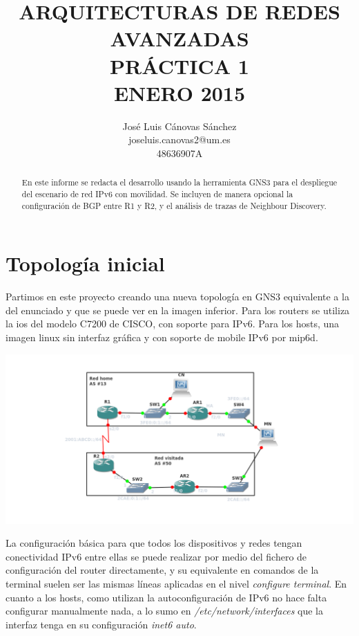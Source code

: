 \documentclass{article}
\author{José Luis Cánovas Sánchez\\joseluis.canovas2@um.es\\48636907A}
\title{ARQUITECTURAS DE REDES AVANZADAS\\PRÁCTICA 1\\ ENERO 2015}
\date{}
\begin{document}
\maketitle

\begin{abstract}
	En este informe se redacta el desarrollo usando la herramienta GNS3 para el despliegue del escenario de red IPv6 con movilidad. Se incluyen de manera opcional la configuración de BGP entre R1 y R2, y el análisis de trazas de Neighbour Discovery.
\end{abstract}

\tableofcontents
\section{Topología inicial}
Partimos en este proyecto creando una nueva topología en GNS3 equivalente a la del enunciado y que se puede ver en la imagen inferior. Para los routers se utiliza la ios del modelo C7200 de CISCO, con soporte para IPv6. Para los hosts, una imagen linux sin interfaz gráfica y con soporte de mobile IPv6 por mip6d.\par

\begin{center}
	\includegraphics[scale=0.5]{images/topologyInic.png}
\end{center}

La configuración básica para que todos los dispositivos y redes tengan conectividad IPv6 entre ellas se puede realizar por medio del fichero de configuración del router directamente, y su equivalente en comandos de la terminal suelen ser las mismas líneas aplicadas en el nivel \textit{configure terminal}. En cuanto a los hosts, como utilizan la autoconfiguración de IPv6 no hace falta configurar manualmente nada, a lo sumo en \textit{/etc/network/interfaces} que la interfaz tenga en su configuración \textit{inet6 auto}.
\\
\end{document}
